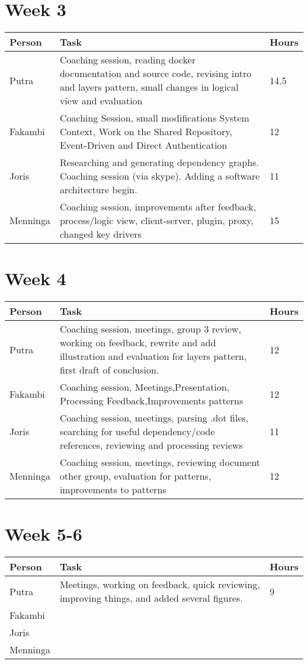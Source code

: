 \section*{Week 3}
\begin{longtable}{p{} p{} p{}}
	\textbf{Person} & \textbf{Task} & \textbf{Hours} \\ \toprule
	Putra           & Coaching session, reading docker documentation and source code, revising intro and layers pattern, small changes in logical view and evaluation & 14.5	\\ \midrule
	Fakambi         & Coaching Session, small modifications System Context, Work on the Shared Repository, Event-Driven and Direct Authentication &	12\\ \midrule
	Joris 			& Researching and generating dependency graphs. Coaching session (via skype). Adding a software architecture begin. & 11 \\ \midrule
	Menninga        & Coaching session, improvements after feedback, process/logic view, client-server, plugin, proxy, changed key drivers & 15 \\ \bottomrule
\end{longtable}

\section*{Week 4}
\begin{longtable}{p{} p{} p{}}
	\textbf{Person} & \textbf{Task} & \textbf{Hours} \\ \toprule
	Putra           & Coaching session, meetings, group 3 review, working on feedback, rewrite and add illustration and evaluation for layers pattern, first draft of conclusion. & 12 \\ \midrule
	Fakambi         & Coaching session, Meetings,Presentation, Processing Feedback,Improvements patterns & 12 \\ \midrule
	Joris 			& Coaching session, meetings, parsing .dot files, searching for useful dependency/code references, reviewing and processing reviews & 11\\ \midrule
	Menninga        & Coaching session, meetings, reviewing document other group, evaluation for patterns, improvements to patterns & 12 \\ \bottomrule
\end{longtable}

\section*{Week 5-6}
\begin{longtable}{p{} p{} p{}}
	\textbf{Person} & \textbf{Task} & \textbf{Hours} \\ \toprule
	Putra           & Meetings, working on feedback, quick reviewing, improving things, and added several figures. & 9 \\ \midrule
	Fakambi         & & \\ \midrule
	Joris 			& & \\ \midrule
	Menninga        & & \\ \bottomrule
\end{longtable}